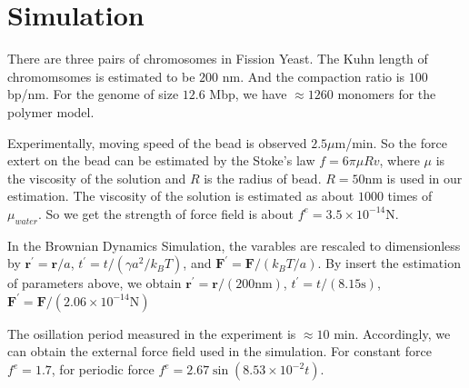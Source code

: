 \documentclass[12pt,a4paper]{article}
\begin{document}
\section{Simulation}
\label{sec:simulation}

There are three pairs of chromosomes in Fission Yeast. The Kuhn length of
chromomsomes is estimated to be $200$ nm. And the compaction ratio is $100$
bp/nm. For the genome of size $12.6$ Mbp, we have $\approx 1260$ monomers for
the polymer model. 

Experimentally, moving speed of the bead is observed $2.5 \mu$m/min. So the
force extert on the bead can be estimated by the Stoke's law $f = 6\pi\mu R v$,
where $\mu$ is the viscosity of the solution and $R$ is the radius of bead.
$R=50$nm is used in our estimation. The viscosity of the solution is estimated
as about $1000$ times of $\mu_{water}$. So we get the strength of force field
is about $f^e = 3.5 \times 10^{-14}$N. 

In the Brownian Dynamics Simulation, the varables are rescaled to dimensionless
by $\mathbf{r}^\prime = \mathbf{r}/a$, $t^\prime = t/(\gamma a^2/k_BT)$, and
$\mathbf{F}^\prime = \mathbf{F}/(k_BT/a)$. By insert the estimation of
parameters above, we obtain $\mathbf{r}^\prime = \mathbf{r}/(200\text{nm})$,
$t^\prime = t/(8.15\text{s})$, $\mathbf{F}^\prime =
\mathbf{F}/(2.06\times10^{-14} \text{N})$

The osillation period measured in the experiment is $\approx 10$ min.
Accordingly, we can obtain the external force field used in the simulation. For
constant force $f^e = 1.7$, for periodic force $f^e =
2.67\sin(8.53\times10^{-2}t)$.

 
\end{document}
